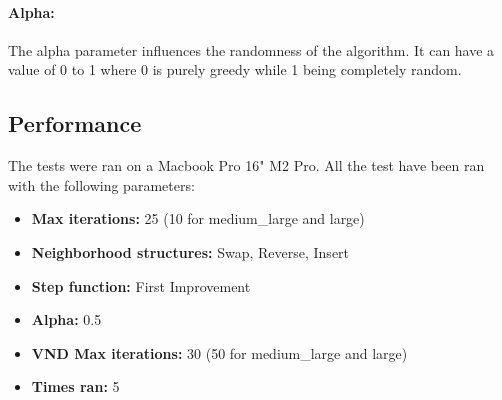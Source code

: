 \documentclass{article}
\begin{document}
\paragraph{Alpha:}
The alpha parameter influences the randomness of the algorithm. It can have a value of 0 to 1 where 0 is purely greedy while 1 being completely random.

\subsection*{Performance}
The tests were ran on a Macbook Pro 16" M2 Pro. All the test have been ran with the following parameters: 
\begin{itemize}
	\item \textbf{Max iterations:} 25 (10 for medium\_large and large)
	\item \textbf{Neighborhood structures:} Swap, Reverse, Insert
	\item \textbf{Step function:} First Improvement
	\item \textbf{Alpha:} 0.5
	\item \textbf{VND Max iterations:} 30 (50 for medium\_large and large)
	\item \textbf{Times ran:} 5
\end{itemize}
\end{document}
